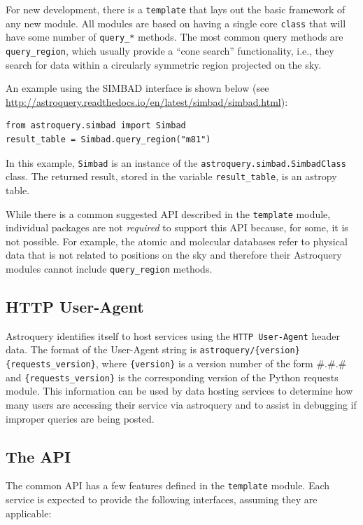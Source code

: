 \documentclass[twocolumn]{aastex61}
\begin{document}
For new development, there is a \texttt{template}  that lays out the basic
framework of any new module.  All modules are based on having a single core
\texttt{class} that will have some number of \texttt{query\_*} methods.
The most common query methods are \texttt{query\_region}, which usually provide
a ``cone search'' functionality, i.e., they search for data within a circularly
symmetric region projected on the sky.

An example using the SIMBAD interface is shown below (see
\url{http://astroquery.readthedocs.io/en/latest/simbad/simbad.html}):
\begin{lstlisting}[caption=Query SIMBAD for a region around M81]
from astroquery.simbad import Simbad
result_table = Simbad.query_region("m81")
\end{lstlisting}
In this example, \texttt{Simbad} is an instance of the
\texttt{astroquery.simbad.SimbadClass} class.
The returned result, stored in the variable \texttt{result\_table},
is an astropy table.

While there is a common suggested API described in the \texttt{template} module,
individual packages are not \emph{required} to support this API because, for
some, it is not possible.  For example, the atomic and molecular databases refer
to physical data that is not related to positions on the sky and therefore
their Astroquery modules cannot include \texttt{query\_region} methods.

\subsection{HTTP User-Agent}
Astroquery identifies itself to host services using the \texttt{HTTP
User-Agent} header data.  The format of the User-Agent string is
\texttt{astroquery/\{version\} \{requests\_version\}}, where
\texttt{\{version\}} is a version number of the form \#.\#.\# and
\texttt{\{requests\_version\}} is the corresponding version of the Python
requests module.  This information can be used by data hosting services
to determine how many users are accessing their service via astroquery
and to assist in debugging if improper queries are being posted.

\subsection{The API}
The common API has a few features defined in the \texttt{template} module.
Each service is expected to provide the following interfaces, assuming they are
applicable:
\end{document}
